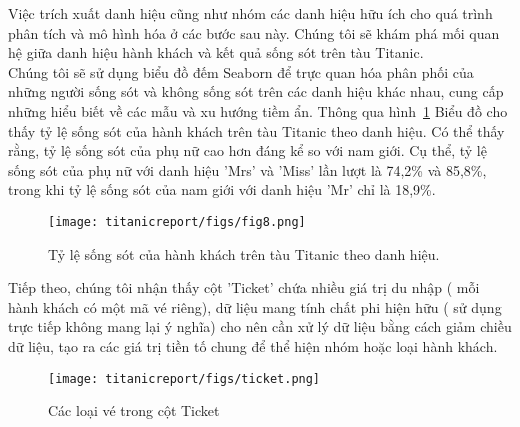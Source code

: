 \documentclass[11pt]{article}
\begin{document}
Việc trích xuất danh hiệu cũng như nhóm các danh hiệu hữu ích cho quá trình phân tích và mô hình hóa ở các bước sau này. Chúng tôi sẽ khám phá mối quan hệ giữa danh hiệu hành khách và kết quả sống sót trên tàu Titanic.\\
Chúng tôi sẽ sử dụng biểu đồ đếm Seaborn để trực quan hóa phân phối của những người sống sót và không sống sót trên các danh hiệu khác nhau, cung cấp những hiểu biết về các mẫu và xu hướng tiềm ẩn. Thông qua hình~\ref{fig:title} Biểu đồ cho thấy tỷ lệ sống sót của hành khách trên tàu Titanic theo danh hiệu. Có thể thấy rằng, tỷ lệ sống sót của phụ nữ cao hơn đáng kể so với nam giới. Cụ thể, tỷ lệ sống sót của phụ nữ với danh hiệu 'Mrs' và 'Miss' lần lượt là 74,2\% và 85,8\%, trong khi tỷ lệ sống sót của nam giới với danh hiệu 'Mr' chỉ là 18,9\%.

\begin{figure}[ht]
    \centering
    \texttt{[image: titanicreport/figs/fig8.png]}
    \caption{Tỷ lệ sống sót của hành khách trên tàu Titanic theo danh hiệu.}
    \label{fig:title}
\end{figure}
Tiếp theo, chúng tôi nhận thấy cột 'Ticket'  chứa nhiều giá trị du nhập ( mỗi hành khách có một mã vé riêng), dữ liệu mang tính chất phi hiện hữu ( sử dụng trực tiếp không mang lại ý nghĩa) cho nên cần xử lý dữ liệu bằng cách giảm chiều dữ liệu, tạo ra các giá trị tiền tố chung để thể hiện nhóm hoặc loại hành khách.
\begin{figure}[ht]
    \centering
    \texttt{[image: titanicreport/figs/ticket.png]}
    \caption{Các loại vé trong cột Ticket}
\end{figure}
\end{document}
